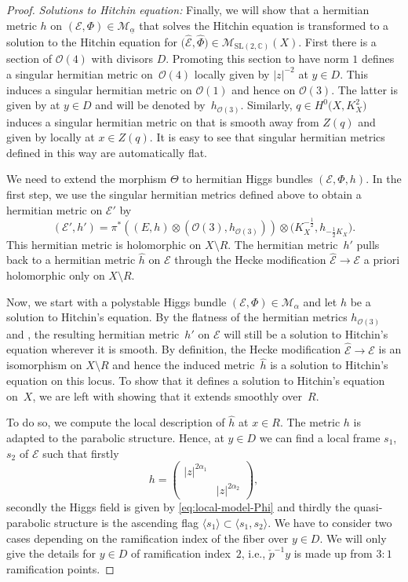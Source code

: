 \documentclass[pdftex]{sigma}
\numberwithin{equation}{section}
\theoremstyle{definition}
\renewcommand{\to}{\rightarrow}
\newcommand{\ualpha}{\underline{\alpha}}
\newcommand{\calE}{\mathcal{E}}
\newcommand{\calM}{\mathcal{M}}
\newcommand{\calO}{\mathcal{O}}
\newcommand{\CC}{\mathbb{C}}
\newcommand{\SL}{\mathrm{SL}}
\begin{document}
\begin{proof}
 \textit{Solutions to Hitchin equation:} Finally, we will show that a hermitian metric $h$ on ${(\calE,\Phi) \in \calM_{\ualpha}}$ that solves the Hitchin equation is transformed to a solution to the Hitchin equation for $\bigl(\hat{\calE},\hat{\Phi}\bigr) \in \calM_{\SL(2,\CC)}(X)$. First there is a section of $\calO(4)$ with divisors $D$. Promoting this section to have norm $1$ defines a singular hermitian metric on~$\calO(4)$ locally given by $\vert z \vert^{-2}$ at $y \in D$. This induces a singular hermitian metric on $\calO(1)$ and hence on $\calO(3)$. The latter is given by  at $y \in D$ and will be denoted by~$h_{\calO(3)}$. Similarly, $q \in H^0\bigl(X,K_X^2\bigr)$ induces a singular hermitian metric  on  that is smooth away from $Z(q)$ and given by  locally at $x \in Z(q)$. It is easy to see that singular hermitian metrics defined in this way are automatically flat.

 We need to extend the morphism $\Theta$ to hermitian Higgs bundles $(\calE,\Phi,h)$. In the first step, we use the singular hermitian metrics defined above to obtain a hermitian metric on $\calE'$ by
 \[ (\calE',h')=\pi^* ((E,h) \otimes (\calO(3),h_{\calO(3)}) ) \otimes \bigl(K_X^{-\frac12},h_{-\frac12 K_X}\bigr).
 \]
 This hermitian metric is holomorphic on $X\setminus R$. The hermitian metric~$h'$ pulls back to a hermitian metric $\hat{h}$ on $\calE$ through the Hecke modification $\hat{\calE} \to \calE$ a priori holomorphic only on $X \setminus R$.

 Now, we start with a polystable Higgs bundle $(\calE,\Phi) \in \calM_{\alpha}$ and let $h$ be a solution to Hitchin's equation. By the flatness of the hermitian metrics $h_{\calO(3)}$ and , the resulting hermitian metric~$h'$ on $\calE$ will still be a solution to Hitchin's equation wherever it is smooth. By definition, the Hecke modification $\hat{\calE} \to \calE$ is an isomorphism on $X \setminus R$ and hence the induced metric~$\hat{h}$ is a solution to Hitchin's equation on this locus. To show that it defines a solution to Hitchin's equation on~$X$, we are left with showing that it extends smoothly over~$R$.

 To do so, we compute the local description of $\hat{h}$ at $x \in R$. The metric $h$ is adapted to the parabolic structure. Hence, at $y \in D$ we can find a local frame $s_1$, $s_2$ of $\calE$ such that firstly
 \[ h= \begin{pmatrix} \vert z \vert^{2\alpha_1} & \\ & \vert z \vert^{2\alpha_2} \end{pmatrix},
 \]
 secondly the Higgs field is given by \eqref{eq:local-model-Phi} and thirdly the quasi-parabolic structure is the ascending flag $\langle s_1 \rangle \subset \langle s_1,s_2 \rangle$. We have to consider two cases depending on the ramification index of the fiber over $y \in D$. We will only give the details for $y \in D$ of ramification index~$2$, i.e., $\check{p}^{-1}y$ is made up from $3:1$ ramification points.


\end{proof}
\end{document}
